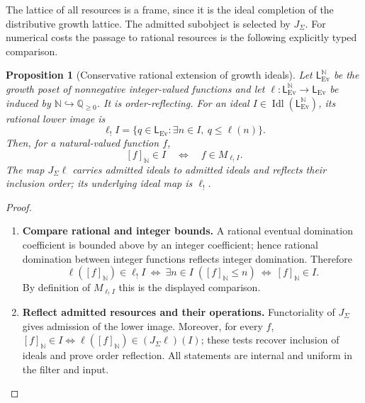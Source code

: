 \documentclass[11pt,a4paper]{article}
\numberwithin{algorithm}{section}
\numberwithin{equation}{section}
\newtheorem{proposition}[proposition]{Proposition}
\theoremstyle{definition}
\theoremstyle{remark}
\theoremstyle{plain}
\newcommand{\N}{\mathbb N}
\newcommand{\QQ}{\mathbb Q}
\newcommand{\Idl}{\operatorname{Idl}}
\newcommand{\J}{J_{\Sigma}}
\newcommand{\Qplus}{{\QQ_{\ge0}}}
\newcommand{\Ev}{{\operatorname{Ev}}}
\theoremstyle{definition}
\theoremstyle{plain}
\begin{document}
The lattice of all resources is a frame, since it is the
ideal completion of the distributive growth lattice.
The admitted subobject is selected by $\J$.
For numerical costs the passage to rational resources is the
following explicitly typed comparison.
\begin{proposition}[Conservative rational extension of growth ideals]
\label{prop:natural-rational-growth}
Let $\mathsf L^{\N}_{\Ev}$ be the growth poset of nonnegative
integer-valued functions and let
$\ell:\mathsf L^{\N}_{\Ev}\to\mathsf L_{\Ev}$ be induced by
$\N\hookrightarrow\Qplus$. It is order-reflecting. For an ideal
$I\in\Idl(\mathsf L^{\N}_{\Ev})$, its rational lower image is
\[
 \ell_!I=\{q\in\mathsf L_{\Ev}:\exists n\in I,\ q\le\ell(n)\}.
\]
Then, for a natural-valued function $f$,
\[
 [f]_{\N}\in I\quad\Longleftrightarrow\quad
 f\in M_{\ell_!I}.
\]
The map $\J\ell$ carries admitted ideals to admitted ideals and
reflects their inclusion order; its underlying ideal map is $\ell_!$.
\end{proposition}
\begin{proof}\leavevmode
\begin{enumerate}[leftmargin=*,align=left]
\item \textbf{Compare rational and integer bounds.}
A rational eventual domination coefficient is bounded above by an
integer coefficient; hence rational domination between integer
functions reflects integer domination. Therefore
\[
 \ell([f]_{\N})\in\ell_!I
 \ \Longleftrightarrow\
 \exists n\in I\;([f]_{\N}\le n)
 \ \Longleftrightarrow\ [f]_{\N}\in I.
\]
By definition of $M_{\ell_!I}$ this is the displayed comparison.

\item \textbf{Reflect admitted resources and their operations.}
Functoriality of $\J$ gives admission of the lower image. Moreover,
for every $f$,
$[f]_{\N}\in I\iff \ell([f]_{\N})\in(\J\ell)(I)$;
these tests recover inclusion of ideals and prove order reflection.
All statements are internal and uniform in the filter and input.
\end{enumerate}
\end{proof}
\end{document}
